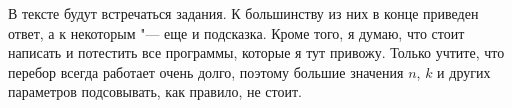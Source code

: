 \documentclass[a4paper,10pt]{problems}
\begin{document}
В тексте будут встречаться задания. К большинству из них в конце приведен ответ, а к некоторым "--- еще и подсказка. Кроме того, я думаю, что стоит написать и потестить все программы, которые я тут привожу. Только учтите, что перебор всегда работает очень долго, поэтому большие значения $n$, $k$ и других параметров подсовывать, как правило, не стоит.







\end{document}
